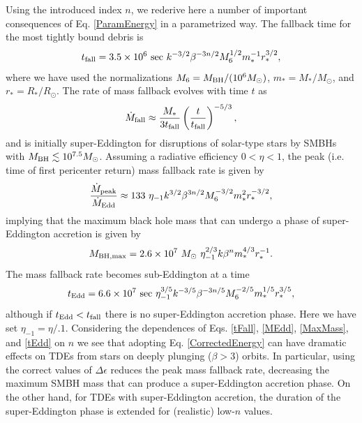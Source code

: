 \documentclass[useAMS, twocolumn, usenatbib]{mn2e}
\begin{document}
Using the introduced index $n$, we rederive here a number of important consequences of Eq. \ref{ParamEnergy} in a parametrized way.  The fallback time for the most tightly bound debris is
\begin{equation}
t_{\rm fall}=3.5\times 10^6 ~{\rm sec}~k^{-3/2}\beta^{-3n/2}M_6^{1/2}m_*^{-1}r_*^{3/2}, \label{tFall}
\end{equation}
where we have used the normalizations $M_6=M_{\rm BH}/(10^6M_{\odot})$, $m_*=M_*/M_{\odot}$, and $r_*=R_*/R_{\odot}$.  The rate of mass fallback evolves with time $t$ as 
\begin{equation}
\dot{M}_{\rm fall}\approx \frac{M_*}{3t_{\rm fall}}\left(\frac{t}{t_{\rm fall}}\right)^{-5/3},
\end{equation}
and is initially super-Eddington for disruptions of solar-type stars by SMBHs with $M_{\rm BH} \lesssim 10^{7.5}M_{\odot}$.  Assuming a radiative efficiency $0<\eta<1$, the peak (i.e. time of first pericenter return) mass fallback rate is given by 
\begin{equation}
\frac{\dot{M}_{\rm peak}}{\dot{M}_{\rm Edd}}\approx 133~ \eta_{-1}k^{3/2}\beta^{3n/2}M_6^{-3/2}m_*^2 r_*^{-3/2}, \label{MEdd}
\end{equation}
implying that the maximum black hole mass that can undergo a phase of super-Eddington accretion is given by
\begin{equation}
M_{\rm BH, max}=2.6\times10^7~M_{\odot}~\eta_{-1}^{2/3}k\beta^nm_*^{4/3}r_*^{-1}. \label{MaxMass}
\end{equation}
The mass fallback rate becomes sub-Eddington at a time 
\begin{equation}
t_{\rm Edd}=6.6\times10^7 ~{\rm sec}~ \eta_{-1}^{3/5}k^{-3/5}\beta^{-3n/5}M_6^{-2/5} m_*^{1/5}r_*^{3/5}, \label{tEdd}
\end{equation}
although if $t_{\rm Edd}<t_{\rm fall}$ there is no super-Eddington accretion phase.  Here we have set $\eta_{-1}=\eta/.1$.  Considering the dependences of Eqs. \ref{tFall}, \ref{MEdd}, \ref{MaxMass}, and \ref{tEdd} on $n$ we see that adopting Eq. \ref{CorrectedEnergy} can have dramatic effects on TDEs from stars on deeply plunging ($\beta > 3$) orbits.  In particular, using the correct values of $\Delta \epsilon$ reduces the peak mass fallback rate, decreasing the maximum SMBH mass that can produce a super-Eddington accretion phase.  On the other hand, for TDEs with super-Eddington accretion, the duration of the super-Eddington phase is extended for (realistic) low-$n$ values.
\end{document}
